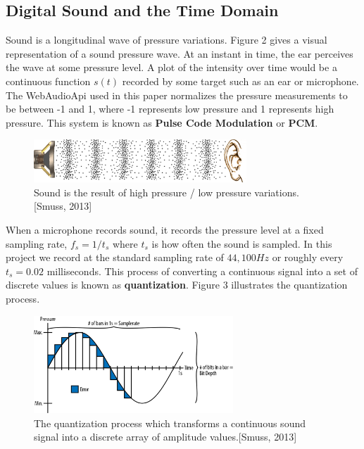 \documentclass[DIV=calc, paper=a4, fontsize=11pt, twocolumn]{scrartcl}   %
\begin{document}
\subsection{Digital Sound and the Time Domain}
Sound is a longitudinal wave of pressure variations. Figure 2 gives a visual representation of a sound pressure wave. At an instant in time, the ear perceives the wave at some pressure level. A plot of the intensity over time would be a continuous function $s(t)$ recorded by some target such as an ear or microphone. The WebAudioApi used in this paper normalizes the pressure measurements to be between -1 and 1, where -1 represents low pressure and 1 represents high pressure. This system is known as \textbf{Pulse Code Modulation} or \textbf{PCM}.

\begin{figure}[h]
\centering
\includegraphics[width=80mm]{figures/pressure_wave.png}
\caption{Sound is the result of high pressure / low pressure variations. [Smuss, 2013]}
\label{overflow}
\end{figure}

\par When a microphone records sound, it records the pressure level at a fixed sampling rate, $ f_s = 1/t_s $ where $t_s$ is how often the sound is sampled. In this project we record at the standard sampling rate of
 $44,100Hz$ or roughly every $t_s =0.02$ milliseconds. This process of converting a continuous signal into a set of discrete values is known as \textbf{quantization}. Figure 3 illustrates the quantization process.

 \begin{figure}[h]
\centering
\includegraphics[width=75mm]{figures/quantization.png}
\caption{The quantization process which transforms a continuous sound signal into a discrete array of amplitude values.[Smuss, 2013]}
\label{overflow}
\end{figure}
\end{document}
